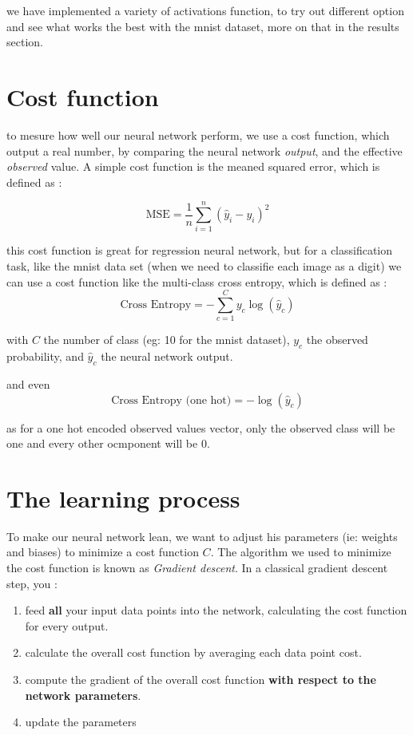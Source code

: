 \documentclass[a4paper, twocolumn, twoside]{article}
\begin{document}
	we have implemented a variety of activations function, to try out different option and see what works the best with the mnist dataset, more on that in the results section.

	\section{Cost function}
	to mesure how well our neural network perform, we use a cost function, which output a real number, by comparing the neural network \textit{output}, and the effective \textit{observed} value.
	A simple cost function is the meaned squared error, which is defined as : 

	$$
	\text{MSE} = \frac{1}{n} \sum_{i=1}^{n} (\hat{y}_i - y_i)^2
	$$

	this cost function is great for regression neural network, but for a classification task, like the mnist data set (when we need to classifie each image as a digit)
	we can use a cost function like the multi-class cross entropy, which is defined as :
	$$
		\text{Cross Entropy} = -\sum_{c=1}^{C} y_{c} \log(\hat{y}_{c})
	$$

	with $C$ the number of class (eg: 10 for the mnist dataset), $y_{c}$ the observed probability, and $\hat{y}_{c}$ the neural network output.

	and even
	$$
		\text{Cross Entropy (one hot)} = -\log(\hat{y}_{c})
	$$

	as for a one hot encoded observed values vector, only the observed class will be one and every other ocmponent will be 0.

	\section{The learning process}
	
	To make our neural network lean, we want to adjust his parameters (ie: weights and biases) to minimize a cost function $C$.
	The algorithm we used to minimize the cost function is known as \textit{Gradient descent}.
	In a classical gradient descent step, you :

	\begin{enumerate}
		\item feed \textbf{all} your input data points into the network, calculating the cost function for every output.
		\item calculate the overall cost function by averaging each data point cost.
		\item compute the gradient of the overall cost function \textbf{with respect to the network parameters}.
		\item update the parameters
	\end{enumerate}
\end{document}
